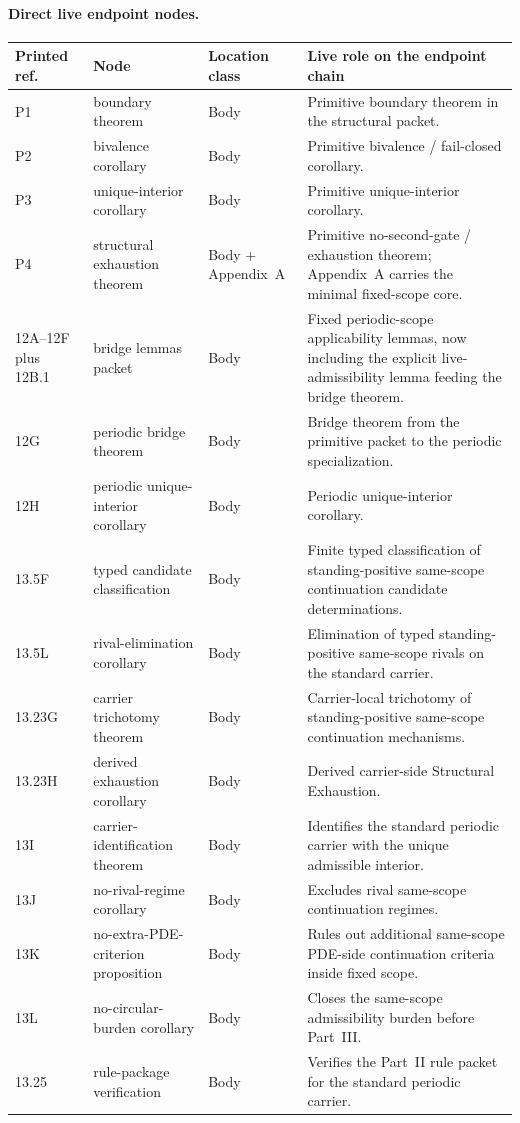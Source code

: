 \paragraph{Direct live endpoint nodes.}
\begin{center}
\footnotesize
\renewcommand{\arraystretch}{1.14}
\setlength{\tabcolsep}{4pt}
\begin{tabularx}{0.98\textwidth}{@{}L{0.12\textwidth}L{0.20\textwidth}L{0.16\textwidth}Y@{}}
\toprule
\textbf{Printed ref.} & \textbf{Node} & \textbf{Location class} & \textbf{Live role on the endpoint chain}\\
\midrule
P1 & boundary theorem & Body & Primitive boundary theorem in the structural packet.\\
P2 & bivalence corollary & Body & Primitive bivalence / fail-closed corollary.\\
P3 & unique-interior corollary & Body & Primitive unique-interior corollary.\\
P4 & structural exhaustion theorem & Body + Appendix~A & Primitive no-second-gate / exhaustion theorem; Appendix~A carries the minimal fixed-scope core.\\
12A--12F plus 12B.1 & bridge lemmas packet & Body & Fixed periodic-scope applicability lemmas, now including the explicit live-admissibility lemma feeding the bridge theorem.\\
12G & periodic bridge theorem & Body & Bridge theorem from the primitive packet to the periodic specialization.\\
12H & periodic unique-interior corollary & Body & Periodic unique-interior corollary.\\
13.5F & typed candidate classification & Body & Finite typed classification of standing-positive same-scope continuation candidate determinations.\\
13.5L & rival-elimination corollary & Body & Elimination of typed standing-positive same-scope rivals on the standard carrier.\\
13.23G & carrier trichotomy theorem & Body & Carrier-local trichotomy of standing-positive same-scope continuation mechanisms.\\
13.23H & derived exhaustion corollary & Body & Derived carrier-side Structural Exhaustion.\\
13I & carrier-identification theorem & Body & Identifies the standard periodic carrier with the unique admissible interior.\\
13J & no-rival-regime corollary & Body & Excludes rival same-scope continuation regimes.\\
13K & no-extra-PDE-criterion proposition & Body & Rules out additional same-scope PDE-side continuation criteria inside fixed scope.\\
13L & no-circular-burden corollary & Body & Closes the same-scope admissibility burden before Part~III.\\
13.25 & rule-package verification & Body & Verifies the Part~II rule packet for the standard periodic carrier.\\
\bottomrule
\end{tabularx}
\end{center}

